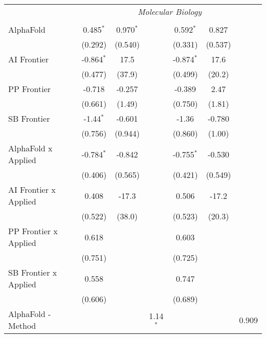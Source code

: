 \begin{tabular}{lcccccc}
 & \multicolumn{6}{c}{\textit{Molecular Biology}} \\ \\
   AlphaFold                      & 0.485$^{*}$  & 0.970$^{*}$ &              & 0.592$^{*}$  & 0.827   &   \\   
                                  & (0.292)      & (0.540)     &              & (0.331)      & (0.537) &   \\   
   AI Frontier                    & -0.864$^{*}$ & 17.5        &              & -0.874$^{*}$ & 17.6    &   \\   
                                  & (0.477)      & (37.9)      &              & (0.499)      & (20.2)  &   \\   
   PP Frontier                    & -0.718       & -0.257      &              & -0.389       & 2.47    &   \\   
                                  & (0.661)      & (1.49)      &              & (0.750)      & (1.81)  &   \\   
   SB Frontier                    & -1.44$^{*}$  & -0.601      &              & -1.36        & -0.780  &   \\   
                                  & (0.756)      & (0.944)     &              & (0.860)      & (1.00)  &   \\   
   AlphaFold x Applied            & -0.784$^{*}$ & -0.842      &              & -0.755$^{*}$ & -0.530  &   \\   
                                  & (0.406)      & (0.565)     &              & (0.421)      & (0.549) &   \\   
   AI Frontier x Applied          & 0.408        & -17.3       &              & 0.506        & -17.2   &   \\   
                                  & (0.522)      & (38.0)      &              & (0.523)      & (20.3)  &   \\   
   PP Frontier x Applied          & 0.618        &             &              & 0.603        &         &   \\   
                                  & (0.751)      &             &              & (0.725)      &         &   \\   
   SB Frontier x Applied          & 0.558        &             &              & 0.747        &         &   \\   
                                  & (0.606)      &             &              & (0.689)      &         &   \\   
   AlphaFold - Method             &              &             & 1.14$^{*}$   &              &         & 0.909\\   

\end{tabular}

